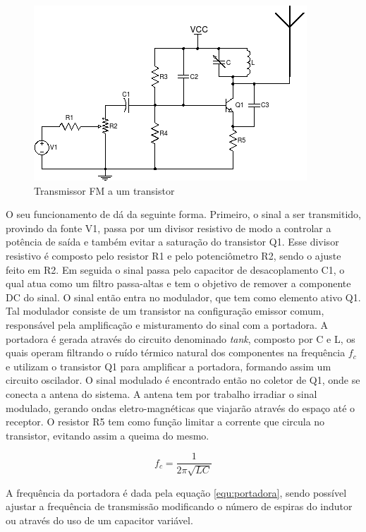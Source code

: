 \documentclass[12pt,a4paper]{article}%
\begin{document}
\begin{figure}[H]
    \centering
    \includegraphics{imagem/fm.png}
    \caption{Transmissor FM a um transistor}
    \label{fig:fm}
\end{figure}

O seu funcionamento de dá da seguinte forma.
Primeiro, o sinal a ser transmitido, provindo da fonte V1, passa por um divisor resistivo de modo a controlar a potência de saída e também evitar a saturação do transistor Q1. Esse divisor resistivo é composto pelo resistor R1 e pelo potenciômetro R2, sendo o ajuste feito em R2.
Em seguida o sinal passa pelo capacitor de desacoplamento C1, o qual atua como um filtro passa-altas e tem o objetivo de remover a componente DC do sinal. O sinal então entra no modulador, que tem como elemento ativo Q1. Tal modulador consiste de um transistor na configuração emissor comum, responsável pela amplificação e misturamento do sinal com a portadora. A portadora é gerada através do circuito denominado \textit{tank}, composto por C e L, os quais operam filtrando o ruído térmico natural dos componentes na frequência $f_c$ e utilizam o transistor Q1 para amplificar a portadora, formando assim um circuito oscilador. O sinal modulado é encontrado então no coletor de Q1, onde se conecta a antena do sistema. A antena tem por trabalho irradiar o sinal modulado, gerando ondas eletro-magnéticas que viajarão através do espaço até o receptor.
O resistor R5 tem como função limitar a corrente que circula no transistor, evitando assim a queima do mesmo.


\begin{equation}
\label{equ:portadora}
f_c = \frac{1}{2 \pi \sqrt{LC}}
\end{equation}
 
A frequência da portadora é dada pela equação \ref{equ:portadora}, sendo possível ajustar a frequência de transmissão modificando o número de espiras do indutor ou através do uso de um capacitor variável.
\end{document}
